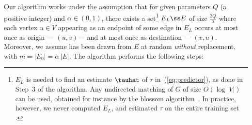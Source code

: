 \iffalse

We now introduce a non-adaptive active learning algorithm approximating the Bayes optimal
predictions $y^*(u,v)$.

Given a positive integer parameter $Q < \tfrac{|E|}{2|V|+1}$ such that there exists a
set\footnote{This set is needed to find an estimate $\tauhat$ of $\tau$ in~(\ref{eq:predictor}), see
Step~3 of the algorithm. It can be any set of directed paths/cycles in $G$ that are pairwise
vertex-disjoint.} $E_L \ss E$ of size $Q$ where each vertex $u \in V$ appearing as an endpoint of
some edge in $E_L$ occurs at most once as origin ---ie{}., $(u,v)$, and at most once as destination
---ie{}., $(v,u)$. The algorithm performs the following steps:

\textbf{1.} For each $u \in V$ such that $\din(u) \ge Q$, $Q$ edges are drawn at random without
replacement from $\Nin(u)$, and their are labels queried. Let $\hdeltain(u) = \hdin^+(u)/Q$, where
$\hdin^+(u)$ is the number of positive edges sampled from $\Nin(u)$;

\textbf{2.} For each $u \in V$ such that $\dout(u) \ge Q$, $Q$ edges are drawn at random without
replacement from $\Nout(u)$ and their labels are queried. Let $ \hdeltaout(u) = \hdout^+(u)/Q $,
where $\hdout^+(u)$ is the number of positive edges sampled from $\Nout(u)$;

\textbf{3.} Sample any edge in $E_L$ not yet sampled, and let $\tauhat$ be the fraction of positive
edges in $E_L$;

\textbf{4.} Any remaining non-sampled edge $(u,v)$ is predicted as $ \yhat(u,v) =
\sgn\big(\hdeltaout(u) + \hdeltain(v) - \tfrac{1}{2} - \tauhat \big) $.
\fi

Our algorithm works under the assumption that for given parameters $Q$ (a positive integer) and
$\alpha \in (0,1)$, there exists a set\footnote{$E_L$ is needed to find an estimate $\tauhat$ of
$\tau$ in~(\ref{eq:predictor}), as done in Step~3 of the algorithm. Any undirected matching of $G$ of
size $O(\log|V|)$ can be used, obtained for instance by the blossom algorithm~\autocite{matching65}.
In practice, however, we never computed $E_L$, and estimated $\tau$
on the entire training set \trainset{}.} $E_L \ss E$ of size $\tfrac{2Q}{\alpha}$ where each vertex
$u \in V$ appearing as an endpoint of some edge in $E_L$ occurs at most once as origin ---\ie{}
$(u,v)$--- and at most once as destination ---\ie{} $(v,u)$. Moreover, we assume \trainset{} has
been drawn from $E$ at random {\em without} replacement, with $m = |E_0| = \alpha\,|E|$. The
algorithm performs the following steps:

